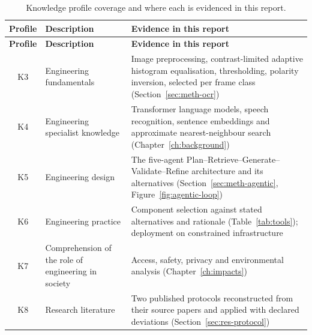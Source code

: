 {\footnotesize\singlespacing
\begin{longtable}{|c|p{5.0cm}|p{6.4cm}|}
\caption{Knowledge profile coverage and where each is evidenced in this report.}
\label{tab:knowledge}\\
\hline
\textbf{Profile} & \textbf{Description} & \textbf{Evidence in this report} \\
\hline
\endfirsthead
\hline
\textbf{Profile} & \textbf{Description} & \textbf{Evidence in this report} \\
\hline
\endhead
\hline
\endfoot
\hline
\endlastfoot

K3 & Engineering fundamentals &
Image preprocessing, contrast-limited adaptive histogram equalisation,
thresholding, polarity inversion, selected per frame class
(Section~\ref{sec:meth-ocr}) \\
\hline
K4 & Engineering specialist knowledge &
Transformer language models, speech recognition, sentence embeddings and
approximate nearest-neighbour search (Chapter~\ref{ch:background}) \\
\hline
K5 & Engineering design &
The five-agent Plan--Retrieve--Generate--Validate--Refine architecture and its
alternatives (Section~\ref{sec:meth-agentic}, Figure~\ref{fig:agentic-loop}) \\
\hline
K6 & Engineering practice &
Component selection against stated alternatives and rationale
(Table~\ref{tab:tools}); deployment on constrained infrastructure \\
\hline
K7 & Comprehension of the role of engineering in society &
Access, safety, privacy and environmental analysis (Chapter~\ref{ch:impacts}) \\
\hline
K8 & Research literature &
Two published protocols reconstructed from their source papers and applied with
declared deviations (Section~\ref{sec:res-protocol}) \\
\hline
\end{longtable}
}

